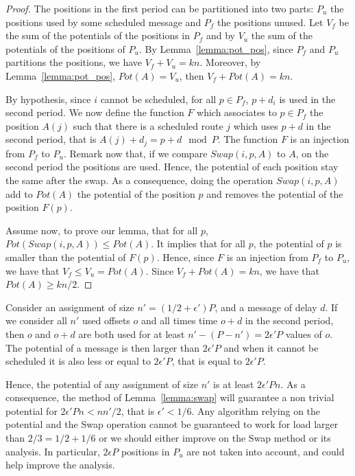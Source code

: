 \documentclass[a4paper,UKenglish,cleveref, autoref, thm-restate]{lipics-v2019}
\begin{document}
\begin{proof}
The positions in the first period can be partitioned into two parts: $P_{u}$ the positions used by some scheduled message and $P_{f}$ the positions unused.
Let $V_f$ be the sum of the potentials of the positions in $P_f$ and by $V_u$ the sum of the potentials of the positions of $P_u$. By Lemma~\ref{lemma:pot_pos}, since $P_f$ and $P_u$ partitions the positions, we have $V_f + V_u = kn$. Moreover, by Lemma~\ref{lemma:pot_pos}, $Pot(A) = V_u$, then $V_f + Pot(A) = kn$.

By hypothesis, since $i$ cannot be scheduled, for all $p \in P_{f}$, $p+d_i$ is used in the second period. We now define the function $F$ which associates to $p \in P_{f}$ the position $A(j)$ such that there is a scheduled route $j$ which uses $p+d$ in the second period, that is $A(j) + d_j = p + d \mod P$. The function $F$ is an injection from $P_{f}$ to $P_u$. Remark now that, if we compare $Swap(i,p,A)$ to $A$, on the second period the positions are used. Hence, the potential of each position stay the same after the swap. As a consequence, doing the operation $Swap(i,p,A)$ add to $Pot(A)$ the potential of the position $p$ and removes the potential of the position $F(p)$. 

Assume now, to prove our lemma, that for all $p$, $Pot(Swap(i,p,A)) \leq Pot(A)$. It implies that for all $p$, the potential of $p$ is smaller than the potential of $F(p)$. Hence, since $F$ is an injection from $P_f$ to $P_u$, we have that $V_f \leq V_u = Pot(A)$. Since $V_f + Pot(A) = kn$, we have that $Pot(A) \geq kn/2$.
\end{proof}

Consider an assignment of size $n' = (1/2 + \epsilon')P$, and a message of delay $d$.
If we consider all $n'$ used offsets $o$ and all times time $o+d$ in the second period, 
then $o$ and $o+d$ are both used for at least $n' - (P -n') = 2\epsilon' P$ values of $o$.
The potential of a message is then larger than $2\epsilon' P$ and when it cannot be scheduled
it is also less or equal to $2\epsilon' P$, that is equal to $2\epsilon' P$.

Hence, the potential of any assignment of size $n'$ is at least $2\epsilon' P n $. As a consequence, the method of Lemma~\ref{lemma:swap} will guarantee a non trivial potential for $2\epsilon' P n <  nn'/2$, that is $\epsilon' < 1/6$. Any algorithm relying on the potential and the Swap operation cannot be guaranteed to work for load larger than $2/3 = 1/2 + 1/6$ or we should either improve on the Swap method or its analysis. In particular, $2\epsilon P$ positions in $P_{u}$
are not taken into account, and could help improve the analysis.
\end{document}
